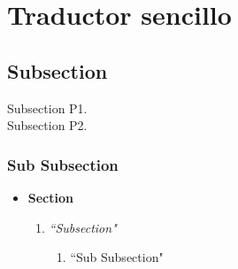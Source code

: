 \documentclass[a4paper]{article}
\begin{document}
    \section*{Traductor sencillo}
    \subsection*{Subsection}

    Subsection P1.\\

    Subsection P2.

    \subsubsection*{Sub Subsection}

    \begin{itemize}
        \item \textbf{Section}
        \begin{enumerate}
            \item \emph{``Subsection"}
            \begin{enumerate}
                \item ``Sub Subsection"
            \end{enumerate}
        \end{enumerate}
    \end{itemize}

    
    
\end{document}
